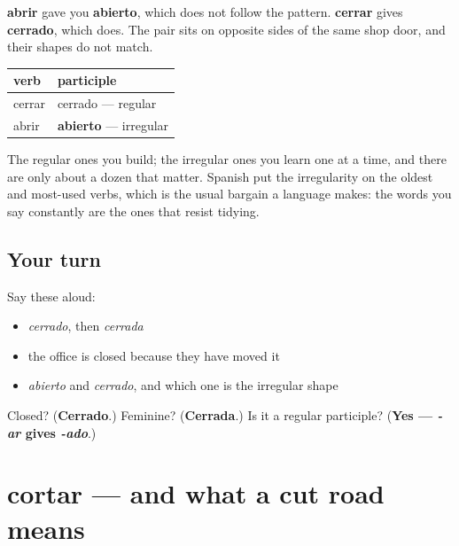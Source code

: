 \begin{grammarlens}[title={Grammar Lens: two participles, two shapes}]
\textbf{abrir} gave you \textbf{abierto}, which does not follow the pattern. \textbf{cerrar} gives \textbf{cerrado}, which does. The pair sits on opposite sides of the same shop door, and their shapes do not match.

\noindent
\begin{tabularx}{\linewidth}{@{}>{\raggedright\arraybackslash}X>{\raggedright\arraybackslash}X@{}}
\toprule
\textbf{verb} & \textbf{participle} \\
\midrule
cerrar & cerrado — regular \\
abrir & \textbf{abierto} — irregular \\
\bottomrule
\end{tabularx}

The regular ones you build; the irregular ones you learn one at a time, and there are only about a dozen that matter. Spanish put the irregularity on the oldest and most-used verbs, which is the usual bargain a language makes: the words you say constantly are the ones that resist tidying.
\end{grammarlens}

\subsection*{Your turn}
Say these aloud:

\begin{itemize}
\raggedright
  \item \emph{cerrado}, then \emph{cerrada}
  \item the office is closed because they have moved it
  \item \emph{abierto} and \emph{cerrado}, and which one is the irregular shape
\end{itemize}

\begin{tcolorbox}[breakable,colback=teal!4,colframe=teal!35!black,title={Before you move on}]
Closed? (\textbf{Cerrado}.) Feminine? (\textbf{Cerrada}.) Is it a regular participle? (\textbf{Yes — \emph{-ar} gives \emph{-ado}}.)
\end{tcolorbox}
\section[cortar]{cortar — and what a cut road means}

\label{lesson:ES-C439-cortar}



